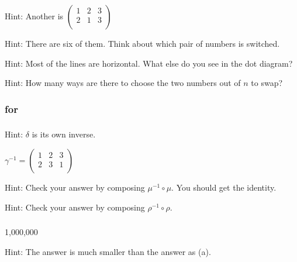 \subsubsection*{ \answers}
\begin{apart}
    \item Hint: Another is $\left ( \begin{array} {ccc} 1 & 2 & 3  \\ 2 & 1 & 3\\ \end{array} \right )$
    \item Hint: There are six of them.  Think about which pair of numbers is switched.
    \item Hint: Most of the lines are horizontal.  What else do you see in the dot diagram?
    \item Hint: How many ways are there to choose the two numbers out of $n$ to swap?
\end{apart}

\subsubsection{\answers for  \subinverses}

\subsubsection*{ \answers}
\begin{apart}
    \item Hint: $\delta$ is its own inverse.
    \item $\displaystyle \gamma^{-1} = \left ( \begin{array} {ccc} 1 & 2 & 3  \\ 2 & 3 & 1 \\ \end{array} \right )$
    \item Hint: Check your answer by composing $\mu^{-1} \circ \mu$. You should get the identity.
    \item Hint: Check your answer by composing $\rho^{-1} \circ \rho$. 
\end{apart}

\subsubsection*{ \answers}
\begin{apart}
    \item 1,000,000
    \item Hint: The answer is much smaller than the answer as (a).
\end{apart}

